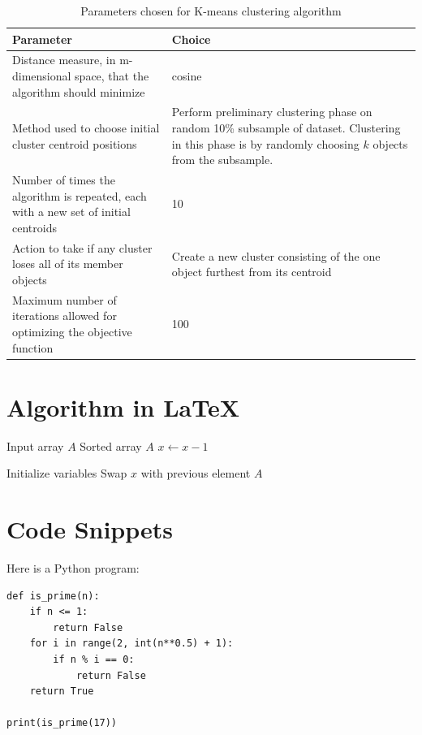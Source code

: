 \renewcommand\arraystretch{2} 
\begin{table} [!h]
\centering
\caption{Parameters chosen for K-means clustering algorithm}
\begin{tabular}{m{7cm}m{7cm}}
\toprule
Parameter & Choice \\
\midrule
Distance measure, in m-dimensional space, that the algorithm should minimize & cosine \\

Method used to choose initial cluster centroid positions & Perform preliminary clustering phase on random 10\% subsample of dataset. Clustering in this phase is by randomly choosing $k$ objects from the subsample. \\

Number of times the algorithm is repeated, each with a new set of initial centroids & 10 \\

Action to take if any cluster loses all of its member objects & Create a new cluster consisting of the one object furthest from its centroid \\

Maximum number of iterations allowed for optimizing the objective function & 100 \\

\bottomrule
\end{tabular}
\label{tab:pkmeans}
\end{table}

\section{Algorithm in \LaTeX}
\begin{algorithm}
\begin{algorithmic}[1]
\REQUIRE Input array $A$
\ENSURE Sorted array $A$
   \STATE $x \gets x-1$
\ENDWHILE

\STATE Initialize variables
        \STATE Swap $x$ with previous element
    \ENDIF
\ENDFOR
\RETURN $A$
\end{algorithmic}
\caption{Algorithm example}
\label{algo:bs}
\end{algorithm}

\section{Code Snippets}

Here is a Python program:

\begin{verbatim}
def is_prime(n):
    if n <= 1:
        return False
    for i in range(2, int(n**0.5) + 1):
        if n % i == 0:
            return False
    return True

print(is_prime(17))
\end{verbatim}